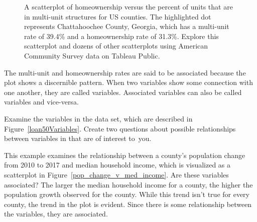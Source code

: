 \begin{figure}[h]
  \centering 
{}
  \caption{A scatterplot of homeownership versus the percent
      of units that are in multi-unit structures for US counties.
      The highlighted dot represents Chattahoochee County, Georgia,
      which has a multi-unit rate of 39.4\% and a homeownership rate
      of 31.3\%. Explore this scatterplot and dozens of other scatterplots using American Community Survey data on Tableau Public.}
  \label{multiunitsVsOwnership}
\end{figure}

The multi-unit and homeownership rates are said to be
associated because the plot shows a discernible pattern.
When two variables show some connection with one another,
they are called  variables.
Associated variables can also be called 
variables and vice-versa.

\D{\newpage}

\begin{exercisewrap}
\begin{nexercise}
Examine the variables in the  data set,
which are described in Figure~\vref{loan50Variables}.
Create two questions about possible relationships
between variables in  that are of interest
to~you.\footnotemark
\end{nexercise}
\end{exercisewrap}

\begin{examplewrap}
\begin{nexample}{This example examines the relationship
    between a county's population change
    from 2010 to 2017
    and median household income,
    which is visualized as a scatterplot in
    Figure~\ref{pop_change_v_med_income}.
    Are these variables associated?}
  The larger the median household income for a county,
  the higher the population growth observed for the county.
  While this trend isn't true for every county,
  the trend in the plot is evident.
  Since there is some relationship between the variables,
  they are associated.
\end{nexample}
\end{examplewrap}

